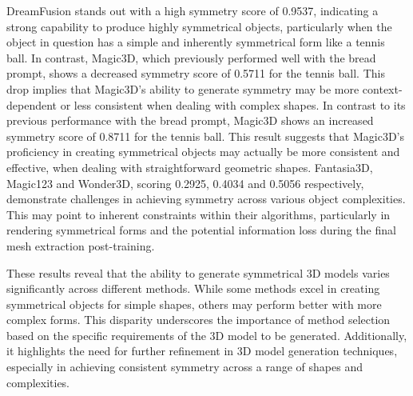 DreamFusion stands out with a high symmetry score of 0.9537, indicating a strong capability to produce highly symmetrical objects, particularly when the object in question has a simple and inherently symmetrical form like a tennis ball. In contrast, Magic3D, which previously performed well with the bread prompt, shows a decreased symmetry score of 0.5711 for the tennis ball. This drop implies that Magic3D's ability to generate symmetry may be more context-dependent or less consistent when dealing with complex shapes. In contrast to its previous performance with the bread prompt, Magic3D shows an increased symmetry score of 0.8711 for the tennis ball. This result suggests that Magic3D's proficiency in creating symmetrical objects may actually be more consistent and effective, when dealing with straightforward geometric shapes. Fantasia3D, Magic123 and Wonder3D, scoring 0.2925, 0.4034 and 0.5056 respectively, demonstrate challenges in achieving symmetry across various object complexities. This may point to inherent constraints within their algorithms, particularly in rendering symmetrical forms and the potential information loss during the final mesh extraction post-training.

These results reveal that the ability to generate symmetrical 3D models varies significantly across different methods. While some methods excel in creating symmetrical objects for simple shapes, others may perform better with more complex forms. This disparity underscores the importance of method selection based on the specific requirements of the 3D model to be generated. Additionally, it highlights the need for further refinement in 3D model generation techniques, especially in achieving consistent symmetry across a range of shapes and complexities.

